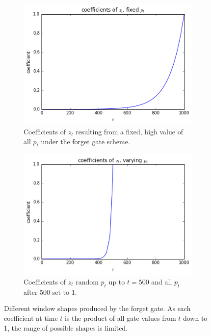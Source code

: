 \begin{figure}[t]
\centering
\begin{subfigure}[t]{0.45\textwidth}
	\centering
	\includegraphics[width=\textwidth]{newarchs/lstmexp}
	\caption{Coefficients of \(z_t\) resulting from a fixed, high value of all \(p_t\)
	under the forget gate scheme.}
\end{subfigure}\hfill
\begin{subfigure}[t]{0.45\textwidth}
	\centering
	\includegraphics[width=\textwidth]{newarchs/lstmrect}
	\caption{Coefficients of \(z_t\) random \(p_t\) up to \(t=500\) and all \(p_t\) after
	500 set to 1.}
\end{subfigure}
\caption[Forget gate window shapes]
{Different window shapes produced by the forget gate. As each coefficient at time \(t\)
is the product of all gate values from \(t\) down to 1, the range of possible shapes is limited.}
\label{fig:lstmgates}
\end{figure}



